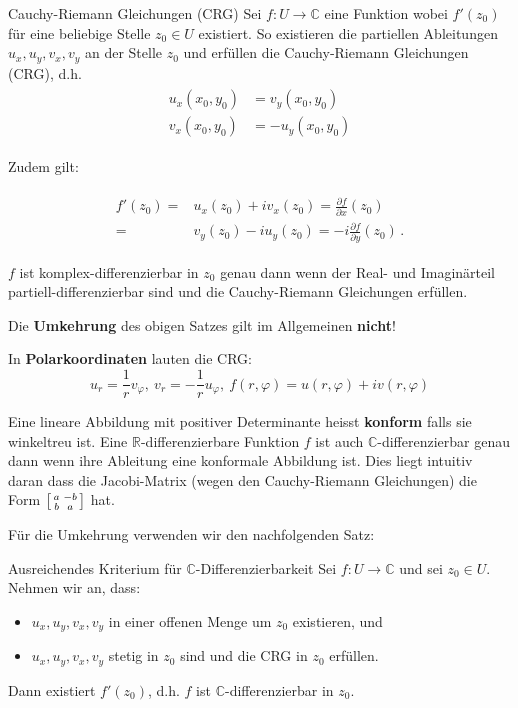 \documentclass[a4paper,10pt]{article}
\def\R{\mathbb{R}}
\def\C{\mathbb{C}}
\begin{document}
\begin{mainbox}{Cauchy-Riemann Gleichungen (CRG)}
  Sei \(f \colon U \to \mathbb{C}\) eine Funktion wobei \(f'(z_0)\) für eine beliebige Stelle \(z_0 \in U\) existiert. So existieren die partiellen Ableitungen \(u_x,u_y,v_x,v_y\) an der Stelle \(z_0\) und erfüllen die Cauchy‐Riemann Gleichungen (CRG), d.h.
  \begin{align*} 
    \begin{aligned}
       u_x (x_0,y_0)&=v_y (x_0,y_0)\\ 
       v_x (x_0,y_0) &=-u_y (x_0,y_0)
    \end{aligned}
  \end{align*}
  
  Zudem gilt:
  
  \begin{align*}
    \begin{aligned}
      f'(z_0) =& u_x(z_0) + i v_x (z_0) = \frac{\partial f}{\partial x}(z_0)\\
       =& v_y(z_0) - i u_y (z_0) = - i \frac{\partial f}{\partial y}(z_0)\,. 
    \end{aligned}
  \end{align*}

  $f$ ist komplex-differenzierbar in $z_0$ genau dann wenn der Real- und Imaginärteil partiell-differenzierbar sind und die Cauchy-Riemann Gleichungen erfüllen.
\end{mainbox}

Die \textbf{Umkehrung} des obigen Satzes gilt im Allgemeinen \textbf{nicht}!

In \textbf{Polarkoordinaten} lauten die CRG:
$$
u_r = \frac1r v_{\varphi}, \ v_r = -\frac1r u_{\varphi}, \ f(r, \varphi) = u(r, \varphi) + i v(r, \varphi)
$$

Eine lineare Abbildung mit positiver Determinante heisst \textbf{konform} falls sie winkeltreu ist. Eine $\R$-differenzierbare Funktion $f$ ist auch $\C$-differenzierbar genau dann wenn ihre Ableitung eine konformale Abbildung ist. Dies liegt intuitiv daran dass die Jacobi-Matrix (wegen den Cauchy-Riemann Gleichungen) die Form $\begin{bsmallmatrix}
  a & -b\\
  b & a
\end{bsmallmatrix}$ hat.

Für die Umkehrung verwenden wir den nachfolgenden Satz:

\begin{mainbox}{Ausreichendes Kriterium für $\C$-Differenzierbarkeit}
  Sei \(f \colon U \to \mathbb{C}\) und sei \(z_0 \in U\). Nehmen wir an, dass:
  \begin{itemize}
    \item \(u_x,u_y,v_x,v_y\) in einer offenen Menge um \(z_0\) existieren, und
    \item \(u_x,u_y,v_x,v_y\) stetig in \(z_0\) sind und die CRG in \(z_0\) erfüllen.
  \end{itemize}
  Dann existiert \(f'(z_0)\), d.h. \(f\) ist \(\mathbb{C}\)-differenzierbar in \(z_0\).
\end{mainbox}
\end{document}
